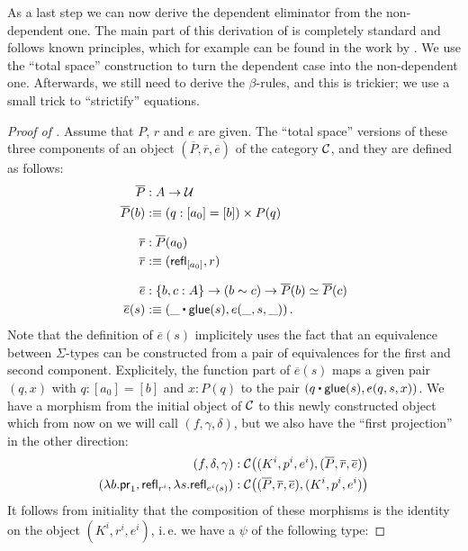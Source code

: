 As a last step we can now derive the dependent eliminator from the non-dependent one.
The main part of this derivation of  is completely
standard and follows known principles,
which for example can be found in the work by \cite{awodeyGamSoja_hoAlgs}.
We use the ``total space'' construction to turn the dependent case into the
non-dependent one.
Afterwards, we still need to derive the $\beta$-rules, and this is trickier;
we use a small trick to ``strictify'' equations.

\begin{proof}[Proof of ]
Assume that $P$, $r$ and $e$ are given.
The ``total space'' versions of these three components of an object
$(\overline P, \overline r, \overline e)$ of the category $\mathcal C$, and they
are defined as follows:
\begin{align*}
  \overline P &: A \to \UU \\
  \overline P(b) &:\equiv (q : [a_0] = [b]) \times P(q) \\[.7em]
  \overline r &: \overline{P}(a_0) \\
  \overline r &:\equiv (\refl_{[a_0]}, r) \\[.7em]
  \overline e &: \{b,c : A\} \to (b \sim c) \to \overline P(b) \simeq \overline P(c) \\
  \overline e (s) &:\equiv \left(\_ \ct \glue(s), e(\_,s,\_)\right). %
\end{align*}
Note that the definition of $\overline e (s)$ implicitely uses the fact that
an equivalence between $\Sigma$-types can be constructed from a pair of
equivalences for the first and second component.
Explicitely, the function part of $\overline e (s)$ maps a given pair
$(q, x)$ with $q : [a_0] = [b]$ and $x : P(q)$
to the pair $(q \ct \glue(s), e(q,s,x))$.
We have a morphism from the initial object of $\mathcal C$ to this newly constructed object
which from now on we will call $(f, \gamma, \delta)$,
but we also have the ``first projection'' in the other direction:
 \begin{align}
  (f,\delta,\gamma) &: \mathcal C\big((K^i,p^i,e^i),(\overline P, \overline r, \overline e)\big)  \label{eq:morphism-from-initial} \\
  (\lambda b. \mathsf{pr}_1,\mathsf{refl}_{r^i},\lambda s. \mathsf{refl}_{e^i(s)}) &: \mathcal C\big((\overline P, \overline r, \overline e),(K^i,p^i,e^i)\big)
 \end{align}
It follows from initiality that the composition of these morphisms is the
identity on the object $(K^i, r^i, e^i)$,
i.\,e. we have a $\psi$ of the following type:

\end{proof}
